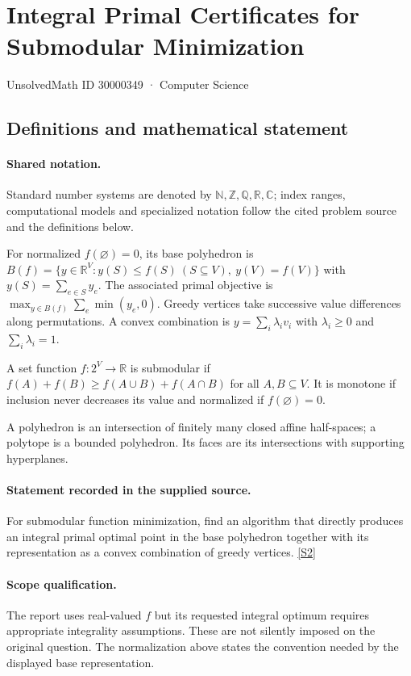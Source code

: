 \documentclass[11pt]{article}
\newcommand{\sref}[2]{\hyperlink{source:#1:#2}{[S#2]}}
\begin{document}
\setcounter{section}{30000348}
\section{Integral Primal Certificates for Submodular Minimization}\label{30000349}
{\small\sffamily UnsolvedMath ID 30000349 · Computer Science}
\subsection{Definitions and mathematical statement}

\paragraph{Shared notation.}Standard number systems are denoted by $\mathbb N,\mathbb Z,\mathbb Q,\mathbb R,\mathbb C$; index ranges, computational models and specialized notation follow the cited problem source and the definitions below.


For normalized $f(\varnothing)=0$, its base polyhedron is $B(f)=\{y\in\mathbb R^V:y(S)\leq f(S)\ (S\subseteq V),\ y(V)=f(V)\}$ with $y(S)=\sum_{e\in S}y_e$. The associated primal objective is $\max_{y\in B(f)}\sum_e\min(y_e,0)$. Greedy vertices take successive value differences along permutations. A convex combination is $y=\sum_i\lambda_i v_i$ with $\lambda_i\geq0$ and $\sum_i\lambda_i=1$.

A set function $f:2^V\to\mathbb R$ is submodular if $f(A)+f(B)\geq f(A\cup B)+f(A\cap B)$ for all $A,B\subseteq V$. It is monotone if inclusion never decreases its value and normalized if $f(\varnothing)=0$.

A polyhedron is an intersection of finitely many closed affine half-spaces; a polytope is a bounded polyhedron. Its faces are its intersections with supporting hyperplanes.
\paragraph{Statement recorded in the supplied source.}
For submodular function minimization, find an algorithm that directly produces an integral primal optimal point in the base polyhedron together with its representation as a convex combination of greedy vertices. \sref{30000349}{2}
\paragraph{Scope qualification.}
The report uses real-valued $f$ but its requested integral optimum requires appropriate integrality assumptions. These are not silently imposed on the original question. The normalization above states the convention needed by the displayed base representation.
\end{document}
